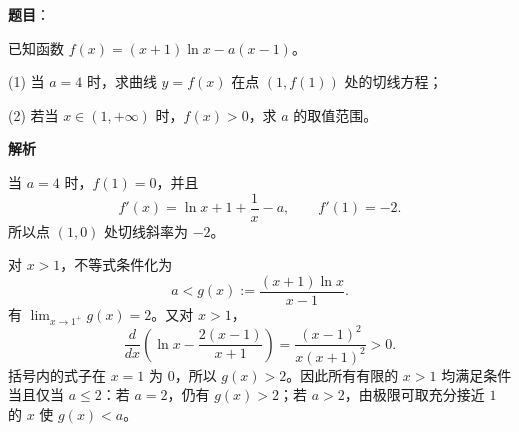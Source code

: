 \begin{answer}

\textbf{题目}：

已知函数 $f(x)=(x+1)\ln x-a(x-1)$。

   (1) 当 $a=4$ 时，求曲线 $y=f(x)$ 在点 $(1,f(1))$ 处的切线方程；

   (2) 若当 $x\in(1,+\infty)$ 时，$f(x)>0$，求 $a$ 的取值范围。

\textbf{解析}


当 $a=4$ 时，$f(1)=0$，并且
\nopagebreak[4]
\[
f'(x)=\ln x+1+\frac1x-a,\qquad f'(1)=-2.
\]
所以点 $(1,0)$ 处切线斜率为 $-2$。


对 $x>1$，不等式条件化为
\nopagebreak[4]
\[
a<g(x):=\frac{(x+1)\ln x}{x-1}.
\]
有 $\lim_{x\to1^+}g(x)=2$。又对 $x>1$，
\nopagebreak[4]
\[
\frac{d}{dx}\left(\ln x-\frac{2(x-1)}{x+1}\right)
=\frac{(x-1)^2}{x(x+1)^2}>0.
\]
括号内的式子在 $x=1$ 为 $0$，所以 $g(x)>2$。因此所有有限的 $x>1$ 均满足条件当且仅当 $a\le2$：若 $a=2$，仍有 $g(x)>2$；若 $a>2$，由极限可取充分接近 $1$ 的 $x$ 使 $g(x)<a$。


\gkanswer{答案（2）：\(a\in(-\infty,2]\)}

\end{answer}

